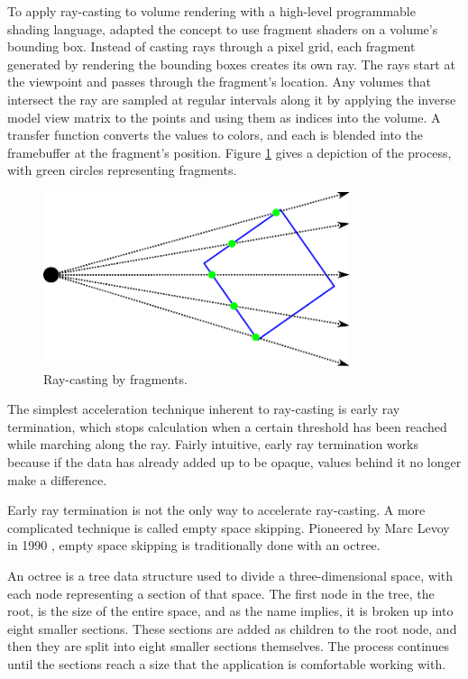 \documentclass{article}
\begin{document}
To apply ray-casting to volume rendering with a high-level programmable shading
language, \cite{Kruger03} adapted the concept to use fragment shaders on a
volume’s bounding box.  Instead of casting rays through a pixel grid, each
fragment generated by rendering the bounding boxes creates its own ray.  The
rays start at the viewpoint and passes through the fragment’s location.  Any
volumes that intersect the ray are sampled at regular intervals along it by
applying the inverse model view matrix to the points and using them as indices
into the volume.  A transfer function converts the values to colors, and each is
blended into the framebuffer at the fragment’s position.  Figure
\ref{fragment-ray-casting} gives a depiction of the process, with green circles
representing fragments.

\begin{figure}
\centering
\includegraphics[width=0.8\textwidth]{fragment-ray-casting.pdf}
\caption{Ray-casting by fragments.}
\label{fragment-ray-casting}
\end{figure}

The simplest acceleration technique inherent to ray-casting is early ray
termination, which stops calculation when a certain threshold has been reached
while marching along the ray.  Fairly intuitive, early ray termination works
because if the data has already added up to be opaque, values behind it no
longer make a difference.

Early ray termination is not the only way to accelerate ray-casting. A more
complicated technique is called empty space skipping.  Pioneered by Marc Levoy
in 1990 \cite{Levoy90}, empty space skipping is traditionally done with an
octree.

An octree is a tree data structure used to divide a three-dimensional space,
with each node representing a section of that space.  The first node in the
tree, the root, is the size of the entire space, and as the name implies, it is
broken up into eight smaller sections.  These sections are added as children to
the root node, and then they are split into eight smaller sections themselves.
The process continues until the sections reach a size that the application is
comfortable working with.
\end{document}
